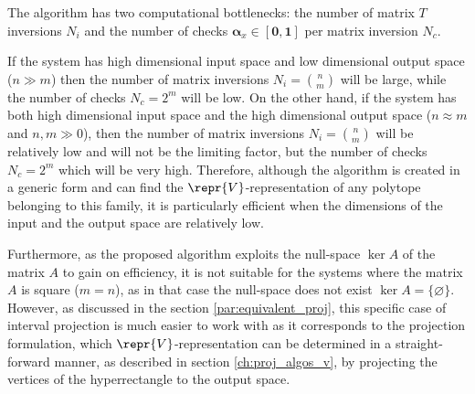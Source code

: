 The algorithm has two computational bottlenecks: the number of matrix $T$ inversions $N_i$ and the number of checks $\bm{\alpha}_x \in [\bm{0},\bm{1}]$ per matrix inversion $N_c$.

If the system has high dimensional input space and low dimensional output space ($n\gg m$) then the number of matrix inversions $N_i=\binom{n}{m}$ will be large, while the number of checks $N_c=2^m$  will be low. 
On the other hand, if the system has both high dimensional input space and the high dimensional output space ($n\approx m$ and $n,m\gg0$), then the number of matrix inversions $N_i=\binom{n}{m}$ will be relatively low and will not be the limiting factor, but the number of checks $N_c=2^m$ which will be very high. Therefore, although the algorithm is created in a generic form and can find the $\repr{V}$-representation of any polytope belonging to this family, it is particularly efficient when the dimensions of the input and the output space are relatively low. 

Furthermore, as the proposed algorithm exploits the null-space $\ker{A}$ of the matrix $A$ to gain on efficiency, it is not suitable for the systems where the matrix $A$ is square ($m\!=\!n$), as in that case the null-space does not exist $\ker{A}=\{\varnothing\}$. However, as discussed in the section \ref{par:equivalent_proj}, this specific case of interval projection is much easier to work with as it corresponds to the projection formulation, which $\repr{V}$-representation can be determined in a straight-forward manner, as described in section \ref{ch:proj_algos_v}, by projecting the vertices of the hyperrectangle to the output space.


